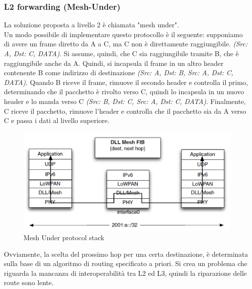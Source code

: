 \documentclass{article}
\begin{document}
\subsubsection{L2 forwarding (Mesh-Under)}
La soluzione proposta a livello 2 è chiamata "mesh under". \\ Un modo possibile di implementare questo protocollo è il seguente: supponiamo di avere un frame diretto da A a C, ma C non è direttamente raggiungibile. \textit{(Src: A, Dst: C, DATA)}. Si assume, quindi, che C sia raggiungibile tramite B, che è raggiungibile anche da A. Quindi, si incapsula il frame in un altro header contenente B come indirizzo di destinazione \textit{(Src: A, Dst: B, Src: A, Dst: C, DATA)}. Quando B riceve il frame, rimuove il secondo header e controlla il primo, determinando che il pacchetto è rivolto verso C, quindi lo incapsula in un nuovo header e lo manda verso C \textit{(Src: B, Dst: C, Src: A, Dst: C, DATA)}. Finalmente, C riceve il pacchetto, rimuove l'header e controlla che il pacchetto sia da A verso C e passa i dati al livello superiore. 
\begin{figure}[H]
\centering
\includegraphics[scale=0.4]{figures/L2 forwarding.png}
\caption{Mesh Under protocol stack}
\end{figure}
Ovviamente, la scelta del prossimo hop per una certa destinazione, è determinata sulla base di un algoritmo di routing specificato a priori. Si crea un problema che riguarda la mancanza di interoperabilità tra L2 ed L3, quindi la riparazione delle route sono lente.
\end{document}
